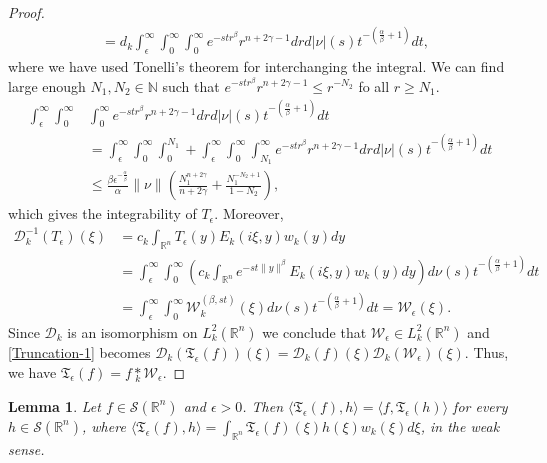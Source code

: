 \documentclass[11pt,a4paper,reqno]{amsproc}
\newtheorem{lemma}[theorem]{Lemma}
\theoremstyle{definition}
\theoremstyle{remark}
\numberwithin{equation}{section}
\begin{document}
\begin{proof}
\begin{align*}
     & = d_k \int_{\epsilon}^\infty \int_0^\infty \int_0^\infty 
     e^{-st r^\beta} r^{n+2\gamma-1}dr d|\nu|(s)t^{-(\frac{\alpha}{\beta}+1)}dt, 
 \end{align*} where we have used Tonelli's theorem for interchanging the integral. We can find large enough $N_1, N_2\in \mathbb{N}$ such that  $e^{-st r^\beta} r^{n+2\gamma-1} \leq r^{-N_2}$ fo all $r\geq N_1$. 
 \begin{align*}
     \int_{\epsilon}^\infty \int_0^\infty& \int_0^\infty 
     e^{-st r^\beta} r^{n+2\gamma-1}dr d|\nu|(s)t^{-(\frac{\alpha}{\beta}+1)}dt \\
     & = \int_{\epsilon}^\infty \int_0^\infty \int_0^{N_1} + \int_{\epsilon}^\infty \int_0^\infty \int_{N_1}^\infty
     e^{-st r^\beta} r^{n+2\gamma-1}dr d|\nu|(s)t^{-(\frac{\alpha}{\beta}+1)}dt\\
     & \leq   \frac{\beta \epsilon^{-\frac{\alpha}{\beta}} }{\alpha}  \|\nu\| \left(   \frac{N_1^{n+2\gamma}}{n+2\gamma} + \frac{N_1^{-N_2+1}}{1-N_2}
     \right),
 \end{align*} which gives the integrability of $T_\epsilon$. Moreover,
 \begin{align*}
      \mathcal{D}_k^{-1}(T_\epsilon)(\xi) &= c_k \int_{\mathbb{R}^n} T_\epsilon(y)E_k(i\xi,y) w_k(y)dy \\
      &= \int_{\epsilon}^\infty \int_0^\infty \left( c_k \int_{\mathbb{R}^n} e^{-st\|y\|^\beta}  E_k(i\xi,y) w_k(y)dy\right) d\nu(s)t^{-(\frac{\alpha}{\beta}+1)}dt\\
      &= \int_{\epsilon}^\infty \int_0^\infty \mathcal{W}_k^{(\beta, st)}(\xi) d\nu(s)t^{-(\frac{\alpha}{\beta}+1)}dt = \mathcal{W}_{\epsilon}(\xi).
 \end{align*} Since $\mathcal{D}_k$ is an isomorphism on $L_k^2(\mathbb{R}^n)$ we conclude that $\mathcal{W}_{\epsilon} \in L_k^2(\mathbb{R}^n)$ and \eqref{Truncation-1} becomes  $ \mathcal{D}_k(\mathfrak{T}_{\epsilon}(f))(\xi)=\mathcal{D}_k(f)(\xi) \mathcal{D}_k(\mathcal{W}_{\epsilon})(\xi)$. Thus, we have $\mathfrak{T}_{\epsilon}(f)= f \underset{k}{\ast}\mathcal{W}_\epsilon$.  
\end{proof}
\begin{lemma} \label{Lemma-c-2}
    Let $f \in \mathcal{S}(\mathbb{R}^n)$ and $\epsilon >0$. Then $\langle \mathfrak{T}_{\epsilon}(f), h \rangle = \langle f, \mathfrak{T}_{\epsilon}(h) \rangle$ for every $h\in \mathcal{S}(\mathbb{R}^n)$, where $ \langle \mathfrak{T}_{\epsilon}(f), h \rangle= \int_{\mathbb{R}^n} \mathfrak{T}_{\epsilon}(f)(\xi)h(\xi)w_k(\xi)d\xi$, in the weak sense.
\end{lemma}
\end{document}
